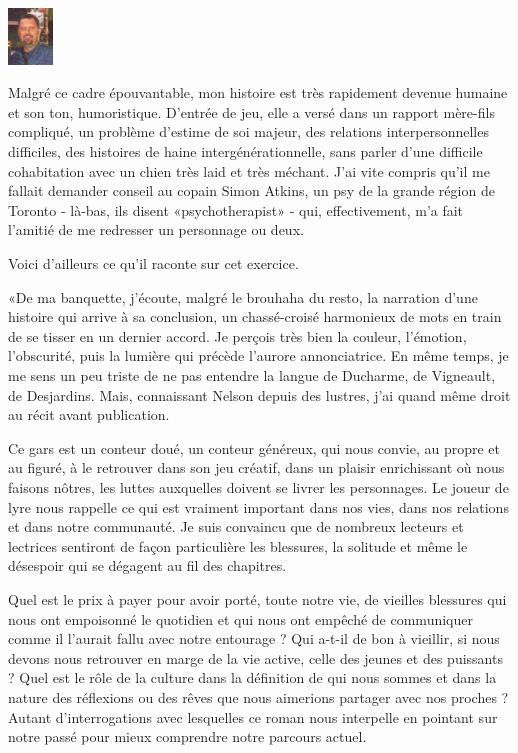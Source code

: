 \begin{floatingfigure}[l]{15mm}
\includegraphics[height=15mm]{intro/preface/img/simon1.jpg}
\end{floatingfigure}

Malgré ce cadre épouvantable, mon histoire est très rapidement devenue humaine et son ton, humoristique. D’entrée de jeu, elle a versé dans un rapport mère-fils compliqué, un problème d’estime de soi majeur, des relations interpersonnelles difficiles, des histoires de haine intergénérationnelle, sans parler d’une difficile cohabitation avec un chien très laid et très méchant. J’ai vite compris qu’il me fallait demander conseil au copain Simon Atkins, un psy de la grande région de Toronto - là-bas, ils disent «psychotherapist» - qui, effectivement, m’a fait l’amitié de me redresser un personnage ou deux.

Voici d’ailleurs ce qu’il raconte sur cet exercice.

«De ma banquette, j’écoute, malgré le brouhaha du resto, la narration d’une histoire qui arrive à sa conclusion, un chassé-croisé harmonieux de mots en train de se tisser en un dernier accord. Je perçois très bien la couleur, l’émotion, l’obscurité, puis la lumière qui précède l’aurore annonciatrice. En même temps, je me sens un peu triste de ne pas entendre la langue de Ducharme, de Vigneault, de Desjardins. Mais, connaissant Nelson depuis des lustres, j’ai quand même droit au récit avant publication.

Ce gars est un conteur doué, un conteur généreux, qui nous convie, au propre et au figuré, à le retrouver dans son jeu créatif, dans un plaisir enrichissant où nous faisons nôtres, les luttes auxquelles doivent se livrer les personnages. Le joueur de lyre nous rappelle ce qui est vraiment important dans nos vies, dans nos relations et dans notre communauté. Je suis convaincu que de nombreux lecteurs et lectrices sentiront de façon particulière les blessures, la solitude et même le désespoir qui se dégagent au fil des chapitres.

Quel est le prix à payer pour avoir porté, toute notre vie, de vieilles blessures qui nous ont empoisonné le quotidien et qui nous ont empêché de communiquer comme il l’aurait fallu avec notre entourage ? Qui a-t-il de bon à vieillir, si nous devons nous retrouver en marge de la vie active, celle des jeunes et des puissants ? Quel est le rôle de la culture dans la définition de qui nous sommes et dans la nature des réflexions ou des rêves que nous aimerions partager avec nos proches ? Autant d’interrogations avec lesquelles ce roman nous interpelle en pointant sur notre passé pour mieux comprendre notre parcours actuel.

